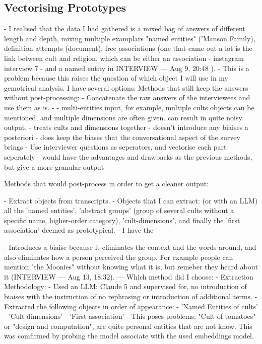 \subsection{Vectorising Prototypes}\label{sec:vectorising_prototypes}

- I realised that the data I had gathered is a mixed bag of answers of different length and depth, mixing multiple examplars "named entities" ('Manson Family), definition attempts (document), free associations (one that came out a lot is the link between cult and religion, which can be either an association - instagram interview 7 - and a named entity in INTERVIEW — Aug 9, 20:48 ).
- This is a problem because this raises the question of which object I will use in my gemotrical analysis. I have several options:
Methods that still keep the answers without post-processing:
- Concatenate the raw answers of the interviewees and use them as is.
	- 
	- multi-entities input, for example, multiple cults objects can be mentioned, and multiple dimensions are often given. can result in quite noisy output.
	- treats cults and dimensions together
	- doesn't introduce any biaises a posteriori
	- does keep the biases that the conversational aspect of the survey brings
- Use interviewer questions as seperators, and vectorise each part seperately
	- would have the advantages and drawbacks as the previous methods, but give a more granular output

Methods that would post-process in order to get a cleaner output:

- Extract objects from transcripts. 
- Objects that I can extract: (or with an LLM) all the 'named entities', 'abstract groups' (group of several cults without a specific name, higher-order category), 'cult-dimensions', and finally the 'first association' deemed as prototypical.
- I have the 

- Introduces a biaise because it eliminates the context and the words around, and also eliminates how a person perceived the group. For example people can mention "the Moonies" without knowing what it is, but remeber they heard about it (INTERVIEW — Aug 13, 18:32).
---
Which method did I choose:
- Extraction Methodology:
	- Used an LLM: Claude 5 and supervised for, no introduction of biaises with the instruction of no rephrasing or introduction of additional terms.
	- Extracted the following objects in order of appearance:
		- 'Named Entities of cults'
		- 'Cult dimensions'
		- 'First association'
	- This poses problems: "Cult of tomatoes" or "design and computation", are quite personal entities that are not know. This was comfirmed by probing the model associate with the used embeddings model. 
	
